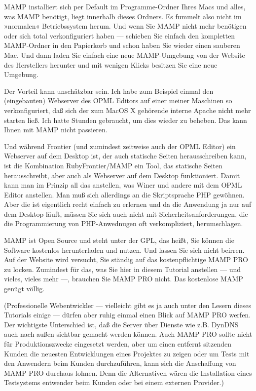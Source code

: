 \documentclass[11pt]{report}
\begin{document}
MAMP installiert sich per Default im Programme-Ordner Ihres Macs und
alles, was MAMP benötigt, liegt innerhalb dieses Ordners. Es fummelt
also nicht im »normalen« Betriebssystem herum. Und wenn Sie MAMP nicht
mehr benötigen oder sich total verkonfiguriert haben — schieben Sie
einfach den kompletten MAMP-Ordner in den Papierkorb und schon haben
Sie wieder einen sauberen Mac. Und dann laden Sie einfach eine neue
MAMP-Umgebung von der Website des Herstellers herunter und mit wenigen
Klicks besitzen Sie eine neue Umgebung.

Der Vorteil kann unschätzbar sein. Ich habe zum Beispiel einmal den
(eingebauten) Webserver des OPML Editors auf einer meiner Maschinen so
verkonfiguriert, daß sich der zum MacOS X gehörende interne Apache
nicht mehr starten ließ. Ich hatte Stunden gebraucht, um dies wieder
zu beheben. Das kann Ihnen mit MAMP nicht passieren.

Und während Frontier (und zumindest zeitweise auch der OPML Editor)
ein Webserver auf dem Desktop ist, der auch statische Seiten
herausschreiben kann, ist die Kombination RubyFrontier/MAMP ein Tool,
das statische Seiten herausschreibt, aber auch als Webserver auf dem
Desktop funktioniert. Damit kann man im Prinzip all das anstellen, was
Winer und andere mit dem OPML Editor anstellen. Man muß sich
allerdings an die Skriptsprache PHP gewöhnen. Aber die ist eigentlich
recht einfach zu erlernen und da die Anwendung ja nur auf dem Desktop
läuft, müssen Sie sich auch nicht mit Sicherheitsanforderungen, die
die Programmierung von PHP-Anwednugen oft verkompliziert,
herumschlagen.

MAMP ist Open Source und steht unter der GPL, das heißt, Sie können
die Software kostenlos herunterladen und nutzen. Und lassen Sie sich
nicht beirren. Auf der Website wird versucht, Sie ständig auf das
kostenpflichtige MAMP PRO zu locken. Zumindest für das, was Sie hier
in diesem Tutorial anstellen — und vieles, vieles mehr —, brauchen Sie
MAMP PRO nicht. Das kostenlose MAMP genügt völlig.

(Professionelle Webentwickler — vielleicht gibt es ja auch unter den
Lesern dieses Tutorials einige — dürfen aber ruhig einmal einen Blick
auf MAMP PRO werfen. Der wichtigste Unterschied ist, daß die Server
über Dienste wie z.B. DynDNS auch nach außen sichtbar gemacht werden
können. Auch MAMP PRO sollte nicht für Produktionszwecke eingesetzt
werden, aber um einen entfernt sitzenden Kunden die neuesten
Entwicklungen eines Projektes zu zeigen oder um Tests mit den
Anwendern beim Kunden durchzuführen, kann sich die Anschaffung von
MAMP PRO durchaus lohnen. Denn die Alternativen wären die Installation
eines Testsystems entwender beim Kunden oder bei einem externen
Provider.)
\end{document}
